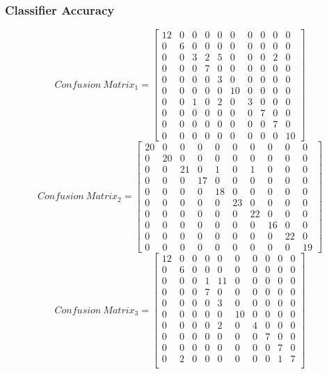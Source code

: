 \documentclass{article}
\begin{document}
			\subsubsection{Classifier Accuracy}	 \label{S541}
			\[
			Confusion~Matrix_{1} = 
			\begin{bmatrix}
			12&0&0&0&0&0&0&0&0&0\\
			0&6&0&0&0&0&0&0&0&0\\
			0&0&3&2&5&0&0&0&2&0\\
			0&0&0&7&0&0&0&0&0&0\\
			0&0&0&0&3&0&0&0&0&0\\
			0&0&0&0&0&10&0&0&0&0\\
			0&0&1&0&2&0&3&0&0&0\\
			0&0&0&0&0&0&0&7&0&0\\
			0&0&0&0&0&0&0&0&7&0\\
			0&0&0&0&0&0&0&0&0&10
			\end{bmatrix}
			\]
			\[
			Confusion~Matrix_{2} = 
			\begin{bmatrix}
			20&0&0&0&0&0&0&0&0&0\\
			0&20&0&0&0&0&0&0&0&0\\
			0&0&21&0&1&0&1&0&0&0\\
			0&0&0&17&0&0&0&0&0&0\\
			0&0&0&0&18&0&0&0&0&0\\
			0&0&0&0&0&23&0&0&0&0\\
			0&0&0&0&0&0&22&0&0&0\\
			0&0&0&0&0&0&0&16&0&0\\
			0&0&0&0&0&0&0&0&22&0\\
			0&0&0&0&0&0&0&0&0&19
			\end{bmatrix}
			\]
			\[
			Confusion~Matrix_{3} = 
			\begin{bmatrix}
			12&0&0&0&0&0&0&0&0&0\\
			0&6&0&0&0&0&0&0&0&0\\
			0&0&0&1&11&0&0&0&0&0\\
			0&0&0&7&0&0&0&0&0&0\\
			0&0&0&0&3&0&0&0&0&0\\
			0&0&0&0&0&10&0&0&0&0\\
			0&0&0&0&2&0&4&0&0&0\\
			0&0&0&0&0&0&0&7&0&0\\
			0&0&0&0&0&0&0&0&7&0\\
			0&2&0&0&0&0&0&0&1&7\\
			\end{bmatrix}
			\]
			\linebreak
\end{document}
